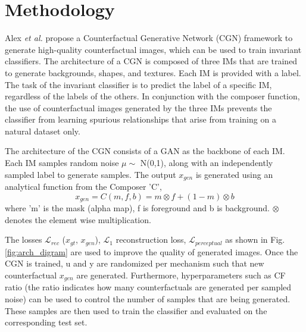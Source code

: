 \section{Methodology}
Alex \textit{et al.} \cite{sauer2021counterfactual} propose a Counterfactual Generative Network (CGN) framework to generate high-quality counterfactual images, which can be used to train invariant classifiers. The architecture of a CGN is composed of three IMs that are trained to generate backgrounds, shapes, and textures. Each IM is provided with a label. The task of the invariant classifier is to predict the label of a specific IM, regardless of the labels of the others. In conjunction with the composer function, the use of counterfactual images generated by the three IMs prevents the classifier from learning spurious relationships that arise from training on a natural dataset only.




The architecture of the CGN consists of a GAN as the backbone of each IM. 
Each IM samples random noise $\mu \sim$ N(0,1), along with an independently sampled label to generate samples. The output $x_{gen}$ is generated using an analytical function from the Composer 
'C',
$$x_{gen} = C(m,f,b) = m \otimes f + (1-m) \otimes b$$ 
where 'm' is the mask (alpha map), f is foreground and b is background. $\otimes$  denotes the element wise multiplication. 

The losses $\mathcal{L}_{rec}$ ($x_{gt}$, $x_{gen}$), $\mathcal{L}_{1}$ reconstruction loss, $\mathcal{L}_{perceptual}$ as shown in Fig. \ref{fig:arch_digram} are used to improve the quality of generated images. Once the CGN is trained, u and y are randomized per mechanism such that new counterfactual $x_{gen}$ are generated. Furthermore, hyperparameters such as CF ratio (the ratio indicates how many counterfactuals are generated per sampled noise) can be used to control the number of samples that are being generated. These samples are then used to train the classifier and evaluated on the corresponding test set. 


